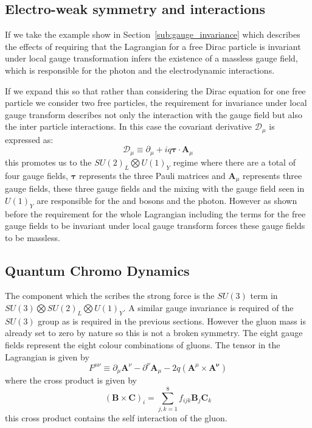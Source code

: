 \subsection{Electro-weak symmetry and interactions} %
\label{sub:electro_weak_symmetry_and_interactions}
If we take the example show in Section~\ref{sub:gauge_invariance} which 
describes the effects of requiring that the Lagrangian for a free Dirac 
particle is invariant under local gauge transformation infers the existence of 
a massless gauge field, which is responsible for the photon and the 
electrodynamic interactions.

If we expand this so that rather than considering the Dirac equation for one 
free particle we consider two free particles, the requirement for invariance 
under local gauge transform describes not only the interaction with the gauge 
field but also the inter particle interactions. In this case the covariant 
derivative $\mathcal{D}_{\mu}$ is expressed as:
\begin{equation}
  \mathcal{D}_{\mu}\equiv \partial_{\mu} + iq \bm{\tau}\cdot\bm{A}_{\mu}
\end{equation}
this promotes us to the $SU(2)_{L} \bigotimes U(1)_{Y}$ regime where there are a total of four gauge fields, $\bm{\tau}$ represents the three Pauli matrices and $\bm{A}_{\mu}$ represents three gauge fields, these three gauge fields and the mixing with the gauge field seen in $U(1)_{Y}$ are responsible for the \PW and \PZ bosons and the photon. However as shown before the requirement for the whole Lagrangian including the terms for the free gauge fields to be invariant under local gauge transform forces these gauge fields to be massless.


\subsection{Quantum Chromo Dynamics} %
\label{sub:quantum_chromo_dynamics}
The component which the scribes the strong force is the $SU(3)$ term in 
$SU(3)\bigotimes SU(2)_{L} \bigotimes U(1)_{Y}$. A similar gauge invariance is required of the $SU(3)$ group as is required in the previous sections. However the gluon mass is already set to zero by nature so this is not a broken symmetry. The eight gauge fields represent the eight colour combinations of gluons. The tensor in the Lagrangian is given by
\begin{equation}
  F^{\mu\nu} \equiv \partial_{\mu}\bm{A}^{\nu} - \partial^{\nu}\bm{A}_{\mu} - 2q\left(\bm{A}^{\mu}\times\bm{A^{\nu}}\right)
\end{equation}
where the cross product is given by
\begin{equation}
  \left(\bm{B}\times\bm{C}\right)_{i} = \sum^{8}_{j,k=1}f_{ijk}\bm{B}_{j}\bm{C}_{k}
\end{equation}
this cross product contains the self interaction of the gluon.





